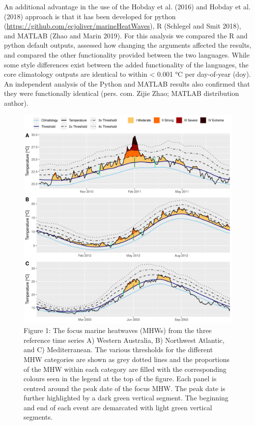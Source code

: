 \documentclass[]{article}
\begin{document}
An additional advantage in the use of the Hobday et al. (2016) and
Hobday et al. (2018) approach is that it has been developed for python
(\url{https://github.com/ecjoliver/marineHeatWaves}), R (Schlegel and
Smit 2018), and MATLAB (Zhao and Marin 2019). For this analysis we
compared the R and python default outputs, assessed how changing the
arguments affected the results, and compared the other functionality
provided between the two languages. While some style differences exist
between the added functionality of the languages, the core climatology
outputs are identical to within \textless{} 0.001 °C per day-of-year
(doy). An independent analysis of the Python and MATLAB results also
confirmed that they were functionally identical (pers. com. Zijie Zhao;
MATLAB distribution author).

\begin{figure}
\centering
\includegraphics{../LaTeX/fig_1.png}
\caption{Figure 1: The focus marine heatwaves (MHWs) from the three
reference time series A) Western Australia, B) Northwest Atlantic, and
C) Mediterranean. The various thresholds for the different MHW
categories are shown as grey dotted lines and the proportions of the MHW
within each category are filled with the corresponding colours seen in
the legend at the top of the figure. Each panel is centred around the
peak date of the focus MHW. The peak date is further highlighted by a
dark green vertical segment. The beginning and end of each event are
demarcated with light green vertical segments.}
\end{figure}
\end{document}

